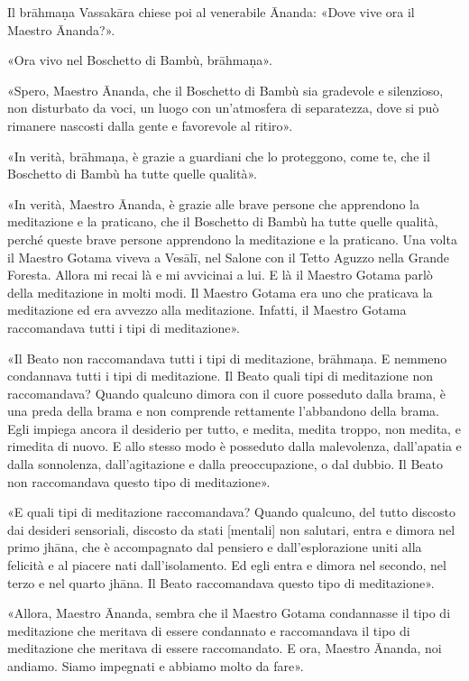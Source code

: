 Il brāhmaṇa Vassakāra chiese poi al venerabile Ānanda: «Dove vive ora il
Maestro Ānanda?».


«Ora vivo nel Boschetto di Bambù, brāhmaṇa».


«Spero, Maestro Ānanda, che il Boschetto di Bambù sia gradevole e
silenzioso, non disturbato da voci, un luogo con un’atmosfera di
separatezza, dove si può rimanere nascosti dalla gente e favorevole al
ritiro».


«In verità, brāhmaṇa, è grazie a guardiani che lo proteggono, come te,
che il Boschetto di Bambù ha tutte quelle qualità».


«In verità, Maestro Ānanda, è grazie alle brave persone che apprendono
la meditazione e la praticano, che il Boschetto di Bambù ha tutte quelle
qualità, perché queste brave persone apprendono la meditazione e la
praticano. Una volta il Maestro Gotama viveva a Vesālī, nel Salone con
il Tetto Aguzzo nella Grande Foresta. Allora mi recai là e mi avvicinai
a lui. E là il Maestro Gotama parlò della meditazione in molti modi. Il
Maestro Gotama era uno che praticava la meditazione ed era avvezzo alla
meditazione. Infatti, il Maestro Gotama raccomandava tutti i tipi di
meditazione».


«Il Beato non raccomandava tutti i tipi di meditazione, brāhmaṇa. E
nemmeno condannava tutti i tipi di meditazione. Il Beato quali tipi di
meditazione non raccomandava? Quando qualcuno dimora con il cuore
posseduto dalla brama, è una preda della brama e non comprende
rettamente l’abbandono della brama. Egli impiega ancora il desiderio per
tutto, e medita, medita troppo, non medita, e rimedita di nuovo. E allo
stesso modo è posseduto dalla malevolenza, dall’apatia e dalla
sonnolenza, dall’agitazione e dalla preoccupazione, o dal dubbio. Il
Beato non raccomandava questo tipo di meditazione».


«E quali tipi di meditazione raccomandava? Quando qualcuno, del tutto
discosto dai desideri sensoriali, discosto da stati [mentali] non
salutari, entra e dimora nel primo jhāna, che è accompagnato dal
pensiero e dall’esplorazione uniti alla felicità e al piacere nati
dall’isolamento. Ed egli entra e dimora nel secondo, nel terzo e nel
quarto jhāna. Il Beato raccomandava questo tipo di meditazione».


«Allora, Maestro Ānanda, sembra che il Maestro Gotama condannasse il
tipo di meditazione che meritava di essere condannato e raccomandava il
tipo di meditazione che meritava di essere raccomandato. E ora, Maestro
Ānanda, noi andiamo. Siamo impegnati e abbiamo molto da fare».



